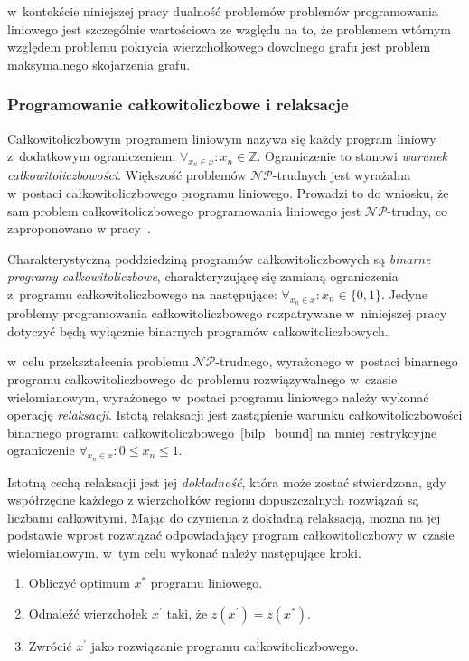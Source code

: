 \par{
  w~kontekście niniejszej pracy dualność problemów problemów programowania
  liniowego jest szczególnie wartościowa ze względu na to, że problemem
  wtórnym względem problemu pokrycia wierzchołkowego dowolnego grafu jest 
  problem maksymalnego skojarzenia grafu.
}

\subsubsection{\textbf{Programowanie całkowitoliczbowe i relaksacje}}
\label{sss_ilp_relaxations}
\par{
  Całkowitoliczbowym programem liniowym nazywa się każdy program liniowy 
  z~dodatkowym ograniczeniem: $\forall_{x_n \in x}: x_n \in
  \mathbb{Z}$\label{ilp_bound}.
  Ograniczenie to stanowi \emph{warunek całkowitoliczbowości}.
  Większość problemów $\mathcal{NP}$-trudnych jest wyrażalna w~postaci całkowitoliczbowego programu liniowego.
  Prowadzi to do wniosku, że sam problem całkowitoliczbowego programowania liniowego jest $\mathcal{NP}$-trudny, co zaproponowano w pracy~\cite{Kar72}.
}
\par{  
  Charakterystyczną poddziedziną programów całkowitoliczbowych są
  \emph{binarne programy całkowitoliczbowe}, charakteryzującę się zamianą
  ograniczenia z~programu całkowitoliczbowego na następujące:
  $\forall_{x_n \in x}: x_n \in \{0, 1\}\label{bilp_bound}$.
  Jedyne problemy programowania całkowitoliczbowego rozpatrywane w~niniejszej
  pracy dotyczyć będą wyłącznie binarnych programów całkowitoliczbowych.
}
\par{
  w~celu przekształcenia problemu $\mathcal{NP}$-trudnego, wyrażonego w~postaci binarnego programu całkowitoliczbowego do problemu rozwiązywalnego w~czasie wielomianowym, wyrażonego w~postaci programu liniowego należy wykonać operację \emph{relaksacji}.
  Istotą relaksacji jest zastąpienie warunku całkowitoliczbowości binarnego
  programu całkowitoliczbowego~\eqref{bilp_bound} na mniej restrykcyjne
  ograniczenie $\forall_{x_n\in x}: 0\leq x_n\leq 1$.
}
\par {
  Istotną cechą relaksacji jest jej \emph{dokładność}, która może zostać
  stwierdzona, gdy współrzędne każdego z wierzchołków regionu dopuszczalnych 
  rozwiązań są liczbami całkowitymi.
  Mając do czynienia z dokładną relaksacją, można na jej podstawie wprost 
  rozwiązać odpowiadający program całkowitoliczbowy w~czasie wielomianowym.
  w~tym celu wykonać należy następujące kroki.
  \begin{enumerate}
    \item Obliczyć optimum $x^*$ programu liniowego.
    \item Odnaleźć wierzchołek $x^{\prime}$ taki, że $z(x^{\prime})=z(x^*)$.
    \item Zwrócić $x^{\prime}$ jako rozwiązanie programu całkowitoliczbowego.
  \end{enumerate}
}

